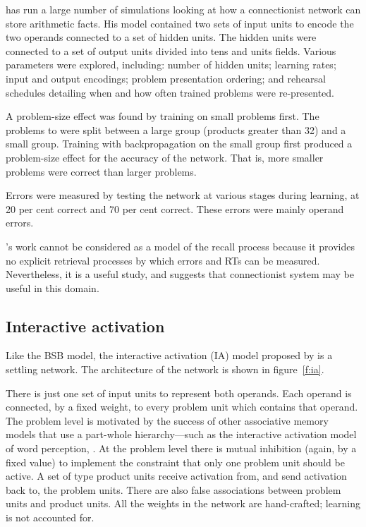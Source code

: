  has run a large number of simulations looking at how a
connectionist network can store arithmetic facts.  His model contained two
sets of input units to encode the two operands connected to a set of hidden
units.  The hidden units were connected to a set of output units divided
into tens and units fields.  Various parameters were explored, including:
number of hidden units; learning rates; input and output encodings; problem
presentation ordering; and rehearsal schedules detailing when
and how often trained
problems were re-presented.

A problem-size effect was found by training on small problems first. The
problems  to  were split between a large group (products
greater than 32)
and a small
group. Training with backpropagation on the small group first
produced a problem-size effect for the accuracy of the network. That
is, more smaller problems were correct than larger problems.

Errors were measured by testing the network at various stages during
learning, at 20 per cent correct and 70 per cent correct.  These errors
were mainly operand errors.

\citeauthor{grahconn}'s work cannot be considered as a model of the recall
process because it provides no explicit retrieval processes by which errors
and RTs can be measured. Nevertheless, it is a useful study, and suggests
that connectionist system may be useful in this domain.



\subsection{Interactive activation}

Like the BSB model, the interactive activation (IA) model proposed by
 is a settling network.  The architecture of the network is
shown in figure~\ref{f:ia}.

There is just one set of input units to represent both operands.  Each
operand is connected, by a fixed weight, to every problem unit which
contains that operand.  The problem level is motivated by the success of
other associative memory models that use a part-whole hierarchy---such as
the interactive activation model of word perception,
\cite[chapter~7]{pdp3}.
At the problem level there is mutual inhibition (again, by a fixed value)
to implement the constraint that only one problem unit should be active.  A
set of type product units receive activation from, and send activation back
to, the problem units. There are also false associations between problem
units and product units. All the weights in the network are hand-crafted;
learning is not accounted for.

